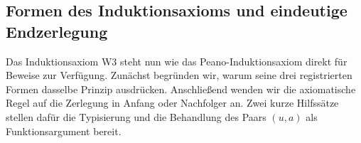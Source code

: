 \subsection{Formen des Induktionsaxioms und eindeutige Endzerlegung}

Das Induktionsaxiom W3 steht nun wie das Peano-Induktionsaxiom direkt
für Beweise zur Verfügung. Zunächst begründen wir, warum seine drei
registrierten Formen dasselbe Prinzip ausdrücken. Anschließend wenden
wir die axiomatische Regel auf die Zerlegung in Anfang oder Nachfolger
an. Zwei kurze Hilfssätze stellen dafür die Typisierung und die
Behandlung des Paars \((u,a)\) als Funktionsargument bereit.

\noindent\begin{minipage}{\linewidth}
\end{minipage}\par
\begin{tabproofwide}
\end{tabproofwide}


